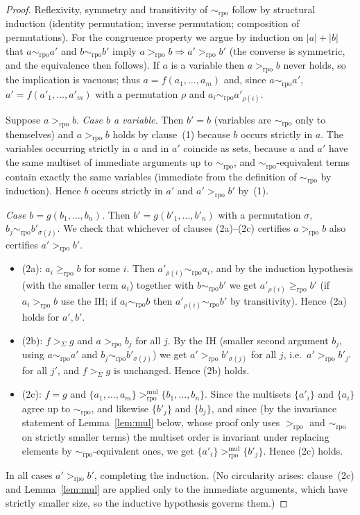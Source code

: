 \documentclass{amsart}
\theoremstyle{definition}
\theoremstyle{remark}
\newcommand{\rpo}{>_{\mathrm{rpo}}}
\newcommand{\rpoe}{\ge_{\mathrm{rpo}}}
\newcommand{\sig}{\Sigma}
\newcommand{\prc}{>_{\sig}}
\newcommand{\size}[1]{|#1|}
\begin{document}
\begin{proof}
Reflexivity, symmetry and transitivity of $\sim_{\mathrm{rpo}}$ follow by
structural induction (identity permutation; inverse permutation; composition of
permutations). For the congruence property we argue by induction on
$\size{a}+\size{b}$ that $a\sim_{\mathrm{rpo}}a'$ and $b\sim_{\mathrm{rpo}}b'$
imply $a\rpo b\Rightarrow a'\rpo b'$ (the converse is symmetric, and the
equivalence then follows). If $a$ is a variable then $a\rpo b$ never holds, so
the implication is vacuous; thus $a=f(a_1,\dots,a_m)$ and, since
$a\sim_{\mathrm{rpo}}a'$, $a'=f(a'_1,\dots,a'_m)$ with a permutation $\rho$ and
$a_i\sim_{\mathrm{rpo}}a'_{\rho(i)}$.

Suppose $a\rpo b$.
\emph{Case $b$ a variable.} Then $b'=b$ (variables are $\sim_{\mathrm{rpo}}$ only
to themselves) and $a\rpo b$ holds by clause~(1) because $b$ occurs strictly in
$a$. The variables occurring strictly in $a$ and in $a'$ coincide as sets,
because $a$ and $a'$ have the same multiset of immediate arguments up to
$\sim_{\mathrm{rpo}}$, and $\sim_{\mathrm{rpo}}$-equivalent terms contain exactly
the same variables (immediate from the definition of $\sim_{\mathrm{rpo}}$ by
induction). Hence $b$ occurs strictly in $a'$ and $a'\rpo b'$ by~(1).

\emph{Case $b=g(b_1,\dots,b_n)$.} Then $b'=g(b'_1,\dots,b'_n)$ with a permutation
$\sigma$, $b_j\sim_{\mathrm{rpo}}b'_{\sigma(j)}$. We check that whichever of
clauses (2a)--(2c) certifies $a\rpo b$ also certifies $a'\rpo b'$.
\begin{itemize}
\item (2a): $a_i\rpoe b$ for some $i$. Then $a'_{\rho(i)}\sim_{\mathrm{rpo}}a_i$,
and by the induction hypothesis (with the smaller term $a_i$) together with
$b\sim_{\mathrm{rpo}}b'$ we get $a'_{\rho(i)}\rpoe b'$ (if $a_i\rpo b$ use the
IH; if $a_i\sim_{\mathrm{rpo}}b$ then $a'_{\rho(i)}\sim_{\mathrm{rpo}}b'$ by
transitivity). Hence (2a) holds for $a',b'$.
\item (2b): $f\prc g$ and $a\rpo b_j$ for all $j$. By the IH (smaller second
argument $b_j$, using $a\sim_{\mathrm{rpo}}a'$ and
$b_j\sim_{\mathrm{rpo}}b'_{\sigma(j)}$) we get $a'\rpo b'_{\sigma(j)}$ for all
$j$, i.e.\ $a'\rpo b'_{j'}$ for all $j'$, and $f\prc g$ is unchanged. Hence (2b)
holds.
\item (2c): $f=g$ and $\{a_1,\dots,a_m\}\rpo^{\mathrm{mul}}\{b_1,\dots,b_n\}$.
Since the multisets $\{a'_i\}$ and $\{a_i\}$ agree up to $\sim_{\mathrm{rpo}}$,
and likewise $\{b'_j\}$ and $\{b_j\}$, and since (by the invariance statement of
Lemma~\ref{lem:mul} below, whose proof only uses $\rpo$ and $\sim_{\mathrm{rpo}}$
on strictly smaller terms) the multiset order is invariant under replacing
elements by $\sim_{\mathrm{rpo}}$-equivalent ones, we get
$\{a'_i\}\rpo^{\mathrm{mul}}\{b'_j\}$. Hence (2c) holds.
\end{itemize}
In all cases $a'\rpo b'$, completing the induction. (No circularity arises:
clause~(2c) and Lemma~\ref{lem:mul} are applied only to the immediate arguments,
which have strictly smaller size, so the inductive hypothesis governs them.)
\end{proof}
\end{document}
